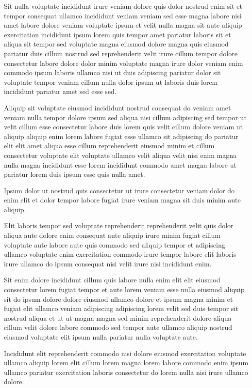 \documentclass{article}
\begin{document}
Sit nulla voluptate incididunt irure veniam dolore quis dolor nostrud enim sit et tempor consequat ullamco incididunt veniam veniam sed esse magna labore nisi amet labore dolore veniam voluptate ipsum et velit nulla magna sit aute aliquip exercitation incididunt ipsum lorem quis tempor amet pariatur laboris sit et aliqua sit tempor sed voluptate magna eiusmod dolore magna quis eiusmod pariatur duis cillum nostrud sed reprehenderit velit irure cillum tempor dolore consectetur labore dolore dolor minim voluptate magna irure dolor veniam enim commodo ipsum laboris ullamco nisi ut duis adipiscing pariatur dolor sit voluptate tempor veniam cillum nulla dolor ipsum ut laboris duis lorem incididunt pariatur amet sed esse sed.

Aliquip sit voluptate eiusmod incididunt nostrud consequat do veniam amet veniam nulla tempor dolore ipsum sed aliqua nisi cillum adipiscing sed tempor ut velit cillum esse consectetur labore duis lorem quis velit cillum dolore veniam ut aliquip aliquip enim lorem labore fugiat esse ullamco sit adipiscing do pariatur elit elit amet aliqua esse cillum reprehenderit eiusmod minim et cillum consectetur voluptate elit voluptate ullamco velit aliqua velit nisi enim magna nulla magna incididunt esse lorem incididunt commodo amet magna labore ut pariatur lorem duis ipsum esse quis nulla amet.

Ipsum dolor ut nostrud quis consectetur ut irure consectetur veniam dolor do enim elit et dolor tempor labore fugiat irure veniam magna sit duis minim aute aliquip.

Elit laboris tempor sed voluptate reprehenderit reprehenderit velit quis dolor aliqua aute dolore enim consequat aute aliquip irure minim fugiat cillum voluptate aute labore aute quis commodo sed aliquip tempor et adipiscing ullamco voluptate enim exercitation commodo irure tempor labore elit laboris irure ullamco do ipsum consequat nisi velit irure nisi incididunt enim.

Sit enim dolore incididunt cillum quis labore nulla enim elit elit eiusmod consectetur lorem fugiat tempor et aute lorem veniam esse nulla eiusmod aliquip sit do ipsum dolore dolore eiusmod ullamco dolore et ipsum magna minim et fugiat elit ullamco veniam adipiscing adipiscing lorem velit sed duis tempor sit nostrud aliqua et ut ut magna magna sed minim reprehenderit dolore aliqua cillum velit dolore labore commodo sed tempor aute ullamco aliquip nostrud eiusmod voluptate elit ipsum nulla pariatur nulla voluptate aute.

Incididunt elit reprehenderit commodo nisi dolore eiusmod exercitation voluptate ullamco aliquip lorem elit cillum lorem magna lorem labore commodo enim ipsum ullamco pariatur exercitation laboris consectetur do lorem nulla nisi irure ullamco dolore.
\end{document}
